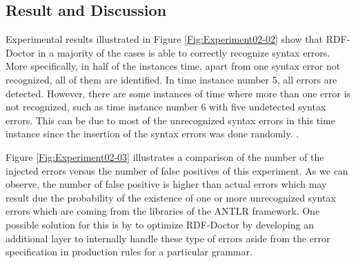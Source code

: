 \subsection{Result and Discussion}

Experimental results illustrated in Figure \ref{Fig:Experiment02-02} show that RDF-Doctor in a majority of the cases is able to correctly recognize syntax errors. 
More specifically, in half of the instances time, apart from one syntax error not recognized, all of them are identified.
In time instance number 5, all errors are detected.
However, there are some instances of time where more than one error is not recognized, such as time instance number 6 with five undetected syntax errors.
This can be due to  most of the unrecognized syntax errors in this time instance since the insertion of the syntax errors was done randomly.
.

Figure \ref{Fig:Experiment02-03} illustrates a comparison of the number of the injected errors versus the number of false positives of this experiment. 
As we can observe, the number of false positive is higher than actual errors which may result due the probability of the existence of one or more unrecognized syntax errors which are coming from the libraries of the ANTLR framework. 
One possible solution for this is by to optimize RDF-Doctor by developing an additional layer to internally handle these type of errors aside from  the error specification in production rules for a particular grammar.


